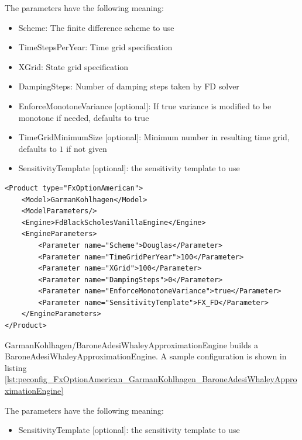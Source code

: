 The parameters have the following meaning:

\begin{itemize}
\item Scheme: The finite difference scheme to use
\item TimeStepsPerYear: Time grid specification
\item XGrid: State grid specification
\item DampingSteps: Number of damping steps taken by FD solver
\item EnforceMonotoneVariance [optional]: If true variance is modified to be monotone if needed, defaults to true
\item TimeGridMinimumSize [optional]: Minimum number in resulting time grid, defaults to $1$ if not given
\item SensitivityTemplate [optional]: the sensitivity template to use
\end{itemize}

\begin{longlisting}
\begin{verbatim}
<Product type="FxOptionAmerican">
    <Model>GarmanKohlhagen</Model>
    <ModelParameters/>
    <Engine>FdBlackScholesVanillaEngine</Engine>
    <EngineParameters>
        <Parameter name="Scheme">Douglas</Parameter>
        <Parameter name="TimeGridPerYear">100</Parameter>
        <Parameter name="XGrid">100</Parameter>
        <Parameter name="DampingSteps">0</Parameter>
        <Parameter name="EnforceMonotoneVariance">true</Parameter>
        <Parameter name="SensitivityTemplate">FX_FD</Parameter>
    </EngineParameters>
</Product>
\end{verbatim}
\caption{Configuration for Product FxOptionAmerican, Model GarmanKohlhagen, Engine FdBlackScholesVanillaEngine}
\label{lst:peconfig_FxOptionAmerican_GarmanKohlhagen_FdBlackScholesVanillaEngine}
\end{longlisting}

GarmanKohlhagen/BaroneAdesiWhaleyApproximationEngine builds a BaroneAdesiWhaleyApproximationEngine. A sample configuration is shown in listing
\ref{lst:peconfig_FxOptionAmerican_GarmanKohlhagen_BaroneAdesiWhaleyApproximationEngine}

The parameters have the following meaning:

\begin{itemize}
\item SensitivityTemplate [optional]: the sensitivity template to use
\end{itemize}

